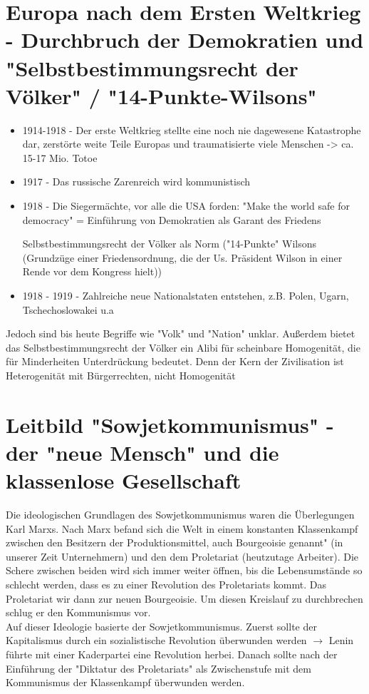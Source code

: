 \documentclass{article}
\begin{document}
\section*{Europa nach dem Ersten Weltkrieg - Durchbruch der Demokratien und "Selbstbestimmungsrecht der Völker" / "14-Punkte-Wilsons"}

\begin{itemize}
    \item 1914-1918 - Der erste Weltkrieg stellte eine noch nie 
    dagewesene Katastrophe dar, zerstörte weite Teile 
    Europas und traumatisierte viele Menschen -> ca. 15-17 Mio. Totoe
    \item 1917 - Das russische Zarenreich wird kommunistisch
    \item 1918 - Die Siegermächte, vor alle die USA forden:
    "Make the world safe for democracy" = Einführung von
    Demokratien als Garant des Friedens
    
    Selbstbestimmungsrecht der Völker als Norm 
    ("14-Punkte" Wilsons (Grundzüge einer Friedensordnung,
    die der Us. Präsident Wilson in einer Rende vor dem 
    Kongress hielt))

    \item 1918 - 1919 - Zahlreiche neue Nationalstaten entstehen, z.B.
    Polen, Ugarn, Tschechoslowakei u.a
    
\end{itemize}
Jedoch sind bis heute Begriffe wie "Volk" und "Nation" unklar.
Außerdem bietet das Selbstbestimmungsrecht der Völker ein Alibi
für scheinbare Homogenität, die für Minderheiten Unterdrückung
bedeutet. Denn der Kern der Zivilisation ist Heterogenität mit
Bürgerrechten, nicht Homogenität

\section*{Leitbild "Sowjetkommunismus" - der "neue Mensch" und die klassenlose Gesellschaft}
Die ideologischen Grundlagen des Sowjetkommunismus waren die 
Überlegungen Karl Marxs. Nach Marx befand sich die Welt in
einem konstanten Klassenkampf zwischen den Besitzern der 
Produktionsmittel, auch Bourgeoisie genannt" (in unserer Zeit Unternehmern) und den
dem Proletariat (heutzutage Arbeiter). Die Schere zwischen 
beiden wird sich immer weiter öffnen, bis die Lebensumstände
so schlecht werden, dass es zu einer Revolution des Proletariats 
kommt. Das Proletariat wir dann zur neuen Bourgeoisie. Um diesen
Kreislauf zu durchbrechen schlug er den Kommunismus vor.
\\Auf dieser Ideologie basierte der Sowjetkommunismus. Zuerst
sollte der Kapitalismus durch ein sozialistische Revolution
überwunden werden $\rightarrow$ Lenin führte mit einer Kaderpartei
eine Revolution herbei.  Danach sollte nach der Einführung der
"Diktatur des Proletariats" als Zwischenstufe mit dem Kommunismus
der Klassenkampf überwunden werden.
\end{document}
